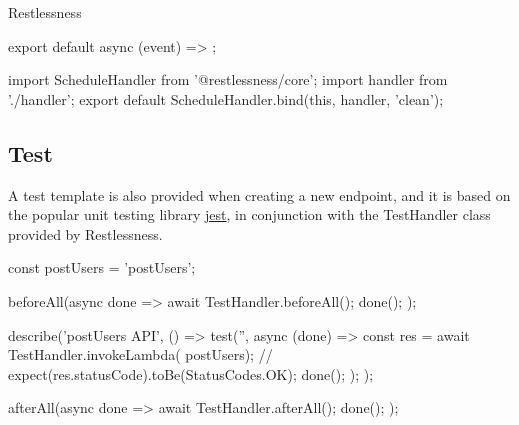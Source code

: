 \begin{chapter}{Restlessness}
    \bigskip
    \begin{code}[caption=handler.ts content, label={lst:sched_handler_ts}]
export default async (event) => {};
    \end{code}

    \bigskip
    \begin{code}[caption=index.ts content, label={lst:sched_index_ts}]
import { ScheduleHandler } from '@restlessness/core';
import handler from './handler';
export default ScheduleHandler.bind(this, handler, 'clean');
    \end{code}

    \subsection{Test}
    A test template is also provided when creating a new endpoint, and it is based
    on the popular unit testing library \href{https://jestjs.io/}{jest}, in
    conjunction with the TestHandler class provided by Restlessness.

    \bigskip
    \begin{code}[caption=index.test.ts template, label={lst:endopints_test_ts}]
const postUsers = 'postUsers';

beforeAll(async done => {
  await TestHandler.beforeAll();
  done();
});

describe('postUsers API', () => {
  test('', async (done) => {
    const res = await TestHandler.invokeLambda(
        postUsers);
    // expect(res.statusCode).toBe(StatusCodes.OK);
    done();
  });
});

afterAll(async done => {
  await TestHandler.afterAll();
  done();
});
    \end{code}

\end{chapter}